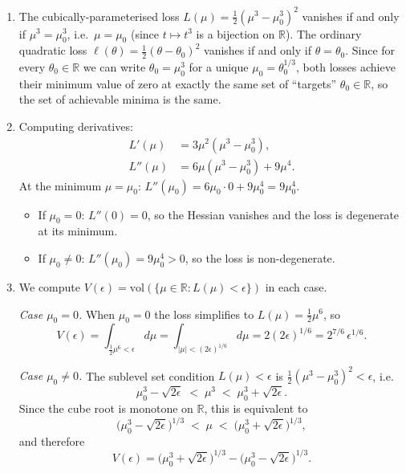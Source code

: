 \documentclass[11pt]{article}
\newcommand{\R}{\mathbb{R}}
\begin{document}
\begin{solution}

\begin{enumerate}
    \item
        The cubically-parameterised loss $L(\mu) = \tfrac{1}{2}(\mu^3 -
        \mu_0^3)^2$ vanishes if and only if $\mu^3 = \mu_0^3$, i.e.\
        $\mu = \mu_0$ (since $t \mapsto t^3$ is a bijection on $\R$).
        The ordinary quadratic loss $\ell(\theta) =
        \tfrac{1}{2}(\theta - \theta_0)^2$ vanishes if and only if
        $\theta = \theta_0$. Since for every $\theta_0 \in \R$ we can
        write $\theta_0 = \mu_0^3$ for a unique $\mu_0 = \theta_0^{1/3}$,
        both losses achieve their minimum value of zero at exactly the
        same set of ``targets'' $\theta_0 \in \R$, so the set of
        achievable minima is the same.

    \item
        Computing derivatives:
        \begin{align*}
            L'(\mu) &= 3\mu^2(\mu^3 - \mu_0^3),
            \\
            L''(\mu) &= 6\mu(\mu^3 - \mu_0^3) + 9\mu^4.
        \end{align*}
        At the minimum $\mu = \mu_0$:
        $L''(\mu_0) = 6\mu_0 \cdot 0 + 9\mu_0^4 = 9\mu_0^4$.
        \begin{itemize}
            \item If $\mu_0 = 0$: $L''(0) = 0$, so the Hessian
                vanishes and the loss is degenerate at its minimum.
            \item If $\mu_0 \neq 0$: $L''(\mu_0) = 9\mu_0^4 > 0$,
                so the loss is non-degenerate.
        \end{itemize}
    
    \item
        We compute $V(\epsilon) = \mathrm{vol}(\{\mu \in \R : L(\mu) < \epsilon\})$ in each case.

\medskip
\noindent\textit{Case $\mu_0 = 0$.}
When $\mu_0 = 0$ the loss simplifies to $L(\mu) = \tfrac{1}{2}\mu^6$, so
\[
    V(\epsilon)
    = \int_{\frac{1}{2}\mu^6 < \epsilon} d\mu
    = \int_{|\mu| < (2\epsilon)^{1/6}} d\mu
    = 2(2\epsilon)^{1/6}
    = 2^{7/6}\,\epsilon^{1/6}.
\]

\medskip
\noindent\textit{Case $\mu_0 \neq 0$.}
The sublevel set condition $L(\mu) < \epsilon$ is $\tfrac{1}{2}(\mu^3 - \mu_0^3)^2 < \epsilon$, i.e.\
\[
    \mu_0^3 - \sqrt{2\epsilon} \;<\; \mu^3 \;<\; \mu_0^3 + \sqrt{2\epsilon}.
\]
Since the cube root is monotone on $\R$, this is equivalent to
\[
    \bigl(\mu_0^3 - \sqrt{2\epsilon}\bigr)^{1/3}
    \;<\; \mu \;<\;
    \bigl(\mu_0^3 + \sqrt{2\epsilon}\bigr)^{1/3},
\]
and therefore
\[
    V(\epsilon)
    = \bigl(\mu_0^3 + \sqrt{2\epsilon}\bigr)^{1/3}
    - \bigl(\mu_0^3 - \sqrt{2\epsilon}\bigr)^{1/3}.
\]


\end{enumerate}
\end{solution}
\end{document}
